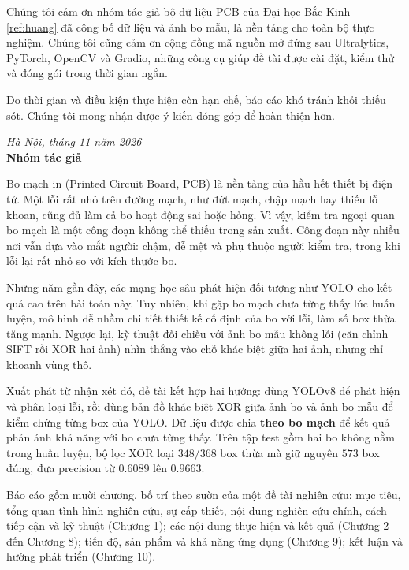 \documentclass[11pt,a4paper]{article}
\newcommand{\tlr}[1]{\ref{ref:#1}}
\newcommand{\chuong}[1]{\clearpage\phantomsection\addcontentsline{toc}{section}{#1}{\centering\section*{#1}\par}}
\begin{document}
Chúng tôi cảm ơn nhóm tác giả bộ dữ liệu PCB của Đại học Bắc Kinh \tlr{huang} đã công bố dữ liệu và ảnh bo mẫu, là nền tảng cho toàn bộ thực nghiệm. Chúng tôi cũng cảm ơn cộng đồng mã nguồn mở đứng sau Ultralytics, PyTorch, OpenCV và Gradio, những công cụ giúp đề tài được cài đặt, kiểm thử và đóng gói trong thời gian ngắn.

Do thời gian và điều kiện thực hiện còn hạn chế, báo cáo khó tránh khỏi thiếu sót. Chúng tôi mong nhận được ý kiến đóng góp để hoàn thiện hơn.

\begin{flushright}
\textit{Hà Nội, tháng 11 năm 2026}\\[2pt]
\textbf{Nhóm tác giả}
\end{flushright}

\chuong{LỜI MỞ ĐẦU}

Bo mạch in (Printed Circuit Board, PCB) là nền tảng của hầu hết thiết bị điện tử. Một lỗi rất nhỏ trên đường mạch, như đứt mạch, chập mạch hay thiếu lỗ khoan, cũng đủ làm cả bo hoạt động sai hoặc hỏng. Vì vậy, kiểm tra ngoại quan bo mạch là một công đoạn không thể thiếu trong sản xuất. Công đoạn này nhiều nơi vẫn dựa vào mắt người: chậm, dễ mệt và phụ thuộc người kiểm tra, trong khi lỗi lại rất nhỏ so với kích thước bo.

Những năm gần đây, các mạng học sâu phát hiện đối tượng như YOLO cho kết quả cao trên bài toán này. Tuy nhiên, khi gặp bo mạch chưa từng thấy lúc huấn luyện, mô hình dễ nhầm chi tiết thiết kế cố định của bo với lỗi, làm số box thừa tăng mạnh. Ngược lại, kỹ thuật đối chiếu với ảnh bo mẫu không lỗi (căn chỉnh SIFT rồi XOR hai ảnh) nhìn thẳng vào chỗ khác biệt giữa hai ảnh, nhưng chỉ khoanh vùng thô.

Xuất phát từ nhận xét đó, đề tài kết hợp hai hướng: dùng YOLOv8 để phát hiện và phân loại lỗi, rồi dùng bản đồ khác biệt XOR giữa ảnh bo và ảnh bo mẫu để kiểm chứng từng box của YOLO. Dữ liệu được chia \textbf{theo bo mạch} để kết quả phản ánh khả năng với bo chưa từng thấy. Trên tập test gồm hai bo không nằm trong huấn luyện, bộ lọc XOR loại $348/368$ box thừa mà giữ nguyên $573$ box đúng, đưa precision từ $0.6089$ lên $0.9663$.

Báo cáo gồm mười chương, bố trí theo sườn của một đề tài nghiên cứu: mục tiêu, tổng quan tình hình nghiên cứu, sự cấp thiết, nội dung nghiên cứu chính, cách tiếp cận và kỹ thuật (Chương 1); các nội dung thực hiện và kết quả (Chương 2 đến Chương 8); tiến độ, sản phẩm và khả năng ứng dụng (Chương 9); kết luận và hướng phát triển (Chương 10).
\end{document}
